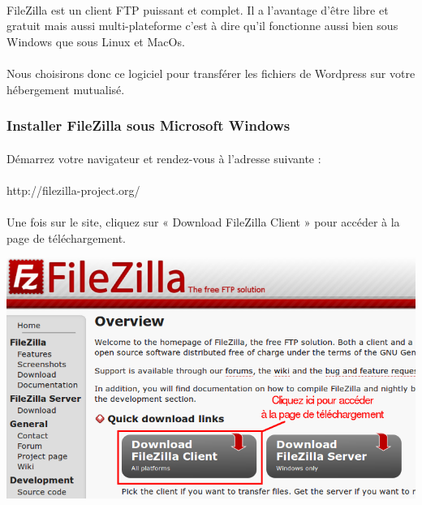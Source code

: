 \documentclass[10pt,a4paper]{article}
\begin{document}
\paragraph{}FileZilla est un client FTP puissant et complet. Il a l'avantage d'être libre et gratuit mais aussi multi-plateforme c'est à dire qu'il fonctionne aussi bien sous Windows que sous Linux et MacOs.
\paragraph{}Nous choisirons donc ce logiciel pour transférer les fichiers de 
Wordpress sur votre hébergement mutualisé.
\subsubsection{Installer FileZilla sous Microsoft Windows}
\paragraph{}Démarrez votre navigateur et rendez-vous à l'adresse suivante :
\paragraph{}http://filezilla-project.org/
\paragraph{}Une fois sur le site, cliquez sur « Download FileZilla Client » pour accéder à la page de téléchargement.
\begin{center}
\includegraphics[scale=0.5]{img/0012.png}
\end{center}
\end{document}
